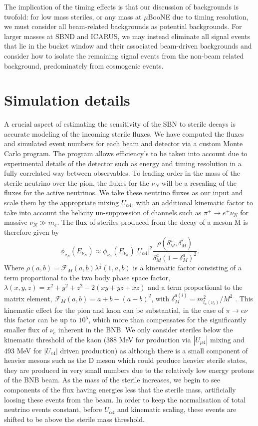 \documentclass[11pt, a4paper]{article}
\begin{document}
The implication of the timing effects is that our discussion of backgrounds is twofold: for low mass steriles, or any mass at $\mu$BooNE due to timing resolution, we must consider all beam-related backgrounds as potential backgrounds. For larger masses at SBND and ICARUS, we may instead eliminate all signal events that lie in the bucket window and their associated beam-driven backgrounds and consider how to isolate the remaining signal events from the non-beam related background, predominately from cosmogenic events.

\section{Simulation details}
A crucial aspect of estimating the sensitivity of the SBN to sterile decays is accurate modeling of the incoming sterile fluxes. We have computed the fluxes and simulated event numbers for each beam and detector via a custom Monte Carlo program. The program allows efficiency's to be taken into account due to experimental details of the detector such as energy and timing resolution in a fully correlated way between observables. To leading order in the mass of the sterile neutrino over the pion, the fluxes
for the $\nu_N$ will be a rescaling of the fluxes for the active
neutrinos.  We take these neutrino fluxes as our input and scale them by the appropriate mixing $U_{\alpha 4}$, with an additional kinematic factor to take into account the helicity un-suppression of channels such as $\pi^+ \rightarrow e^+\nu_N$ for massive $\nu_N \gg m_e$. The flux of steriles produced from the decay of a meson M is therefore given by
\[
	\phi_{\nu_N}(E_{\nu_N}) \approx \phi_{\nu_\alpha} (E_{\nu_\alpha})\vert U_{\alpha 4}\vert^2 \frac{\rho\left( \delta_M^a , \delta_M^i \right)}{\delta_M^a \left(1- \delta_M^a\right)^2}.
\]
Where $\rho(a,b)=\mathcal{F}_M(a,b) \lambda^{\frac{1}{2}}(1,a,b)$ is a kinematic factor consisting of a term proportional to the two body phase space factor, $\lambda(x,y,z)=x^2+y^2+z^2-2(x y+yz+x z)$ and a term proportional to the matrix element, $\mathcal{F}_M(a,b)= a+b -\left(a-b\right)^2$, with $\delta_M^{a(i)}=m_{l_a(\nu_i)}^2/M^2$ \cite{PhysRevD.24.1232}. This kinematic effect for the pion and kaon can be substantial, in the case of $\pi \rightarrow e \nu$ this factor can be up to $10^5$, which more than compensates for the significantly smaller flux of $\nu_e$  inherent in the BNB. We only consider steriles below the kinematic threshold of the kaon (388 MeV for production via $|U_{\mu4}|$ mixing and 493 MeV for $|U_{e4}|$ driven production) as although there is a small component of heavier mesons such as the D meson which could produce heavier sterile states, they are produced in very small numbers due to the relatively low energy protons of the BNB beam. As the mass of the sterile increases, we begin to see components of the flux having energies less that the sterile mass, artificially loosing these events from the beam. In order to keep the normalisation of total neutrino events constant, before $U_{\alpha 4}$ and kinematic scaling, these events are shifted to be above the sterile mass threshold. \\
\end{document}
